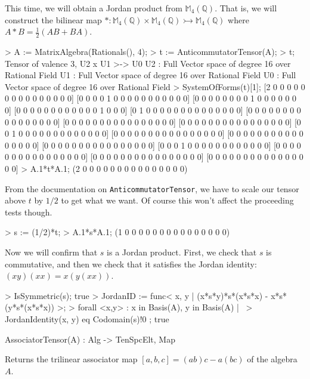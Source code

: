 \begin{example}[MatrixJordanAlgebra]
This time, we will obtain a Jordan product from $\mathbb{M}_4(\mathbb{Q})$. 
That is, we will construct the bilinear map 
$* : \mathbb{M}_4(\mathbb{Q})\times \mathbb{M}_4(\mathbb{Q})\rightarrowtail \mathbb{M}_4(\mathbb{Q})$ 
where $A*B = \frac{1}{2}(AB+BA)$. 
\begin{code}
> A := MatrixAlgebra(Rationals(), 4);
> t := AnticommutatorTensor(A);
> t;
Tensor of valence 3, U2 x U1 >-> U0
U2 : Full Vector space of degree 16 over Rational Field
U1 : Full Vector space of degree 16 over Rational Field
U0 : Full Vector space of degree 16 over Rational Field
> SystemOfForms(t)[1];
[2 0 0 0 0 0 0 0 0 0 0 0 0 0 0 0]
[0 0 0 0 1 0 0 0 0 0 0 0 0 0 0 0]
[0 0 0 0 0 0 0 0 1 0 0 0 0 0 0 0]
[0 0 0 0 0 0 0 0 0 0 0 0 1 0 0 0]
[0 1 0 0 0 0 0 0 0 0 0 0 0 0 0 0]
[0 0 0 0 0 0 0 0 0 0 0 0 0 0 0 0]
[0 0 0 0 0 0 0 0 0 0 0 0 0 0 0 0]
[0 0 0 0 0 0 0 0 0 0 0 0 0 0 0 0]
[0 0 1 0 0 0 0 0 0 0 0 0 0 0 0 0]
[0 0 0 0 0 0 0 0 0 0 0 0 0 0 0 0]
[0 0 0 0 0 0 0 0 0 0 0 0 0 0 0 0]
[0 0 0 0 0 0 0 0 0 0 0 0 0 0 0 0]
[0 0 0 1 0 0 0 0 0 0 0 0 0 0 0 0]
[0 0 0 0 0 0 0 0 0 0 0 0 0 0 0 0]
[0 0 0 0 0 0 0 0 0 0 0 0 0 0 0 0]
[0 0 0 0 0 0 0 0 0 0 0 0 0 0 0 0]
> A.1*t*A.1;
(2 0 0 0 0 0 0 0 0 0 0 0 0 0 0 0)
\end{code}

From the documentation on \texttt{AnticommutatorTensor}, we have to scale our
tensor above $t$ by $1/2$ to get what we want. Of course this won't affect the
proceeding tests though.
\begin{code}
> s := (1/2)*t;
> A.1*s*A.1;
(1 0 0 0 0 0 0 0 0 0 0 0 0 0 0 0)
\end{code}

Now we will confirm that $s$ is a Jordan product. First, we check that $s$ is
commutative, and then we check that it satisfies the Jordan identity:
$(xy)(xx)=x(y(xx))$.
\begin{code}
> IsSymmetric(s);
true
> JordanID := func< x, y | (x*s*y)*s*(x*s*x) - x*s*(y*s*(x*s*x)) >;
> forall{ <x,y> : x in Basis(A), y in Basis(A) | \
>     JordanIdentity(x, y) eq Codomain(s)!0 };
true
\end{code}
\end{example}

\begin{intrinsics}
AssociatorTensor(A) : Alg -> TenSpcElt, Map
\end{intrinsics}

Returns the trilinear associator map $[a,b,c]=(ab)c-a(bc)$ of the algebra $A$.

